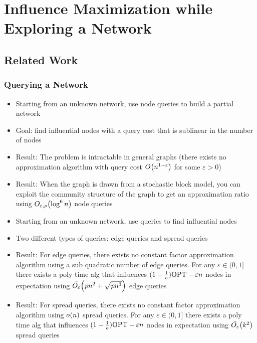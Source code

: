 \newcommand{\expim}{\hyperref[prob:exp-infmax]{\textsf{Exp-InfMax}}}

\section{Influence Maximization while Exploring a Network}

\subsection{Related Work}

\subsubsection{Querying a Network}


\begin{itemize}[label=--]
    \itemsep0em 
    \item Starting from an unknown network, use node queries to build a partial network
    \item Goal: find influential nodes with a query cost that is sublinear in the number of nodes 
    \item Result: The problem is intractable in general graphs (there exists no approximation algorithm with query cost $\bigO{n^{1-\varepsilon}}$ for some $\varepsilon > 0$)
    \item Result: When the graph is drawn from a stochastic block model, you can exploit the community structure of the graph 
    to get an approximation ratio using $\bigO[\varepsilon, \rho]{\log^6 n}$ node queries
\end{itemize}

\begin{itemize}[label=--]
    \itemsep0em 
    \item Starting from an unknown network, use queries to find influential nodes
    \item Two different types of queries: edge queries and spread queries 
    \item Result: For edge queries, there exists no constant factor approximation algorithm using a sub quadratic number of edge queries. 
    For any $\varepsilon \in (0, 1]$ there exists a poly time alg that influences $(1 - \frac{1}{e}) \OPT - \varepsilon n$ nodes in expectation using 
    $\bigOlog[\varepsilon]{pn^2 + \sqrt{pn^3}}$ edge queries
    \item Result: For spread queries, there exists no constant factor approximation algorithm using $\littleO{n}$ spread queries. 
    For any $\varepsilon \in (0, 1]$ there exists a poly time alg that influences $(1 - \frac{1}{e}) \OPT - \varepsilon n$ nodes in expectation using 
    $\bigOlog[\varepsilon]{k^2}$ spread queries
\end{itemize}

